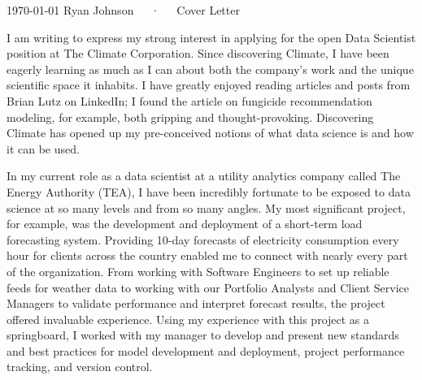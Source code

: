 \documentclass[14pt, a4paper]{awesome-cv}
\begin{document}
\makecvheader[R]

\makecvfooter
  {\today}
  {}
  {Ryan Johnson~~~·~~~Cover Letter}

\makelettertitle

\begin{cvletter}


I am writing to express my strong interest in applying for the open Data Scientist position at The Climate Corporation. Since discovering Climate, I have been eagerly learning as much as I can about both the company's work and the unique scientific space it inhabits. I have greatly enjoyed reading articles and posts from Brian Lutz on LinkedIn; I found the article on fungicide recommendation modeling, for example, both gripping and thought-provoking. Discovering Climate has opened up my pre-conceived notions of what data science is and how it can be used. 

In my current role as a data scientist at a utility analytics company called The Energy Authority (TEA), I have been incredibly fortunate to be exposed to data science at so many levels and from so many angles. My most significant project, for example, was the development and deployment of a short-term load forecasting system. Providing 10-day forecasts of electricity consumption every hour for clients across the country enabled me to connect with nearly every part of the organization. From working with Software Engineers to set up reliable feeds for weather data to working with our Portfolio Analysts and Client Service Managers to validate performance and interpret forecast results, the project offered invaluable experience. Using my experience with this project as a springboard, I worked with my manager to develop and present new standards and best practices for model development and deployment, project performance tracking, and version control. 


\end{cvletter}
\end{document}
